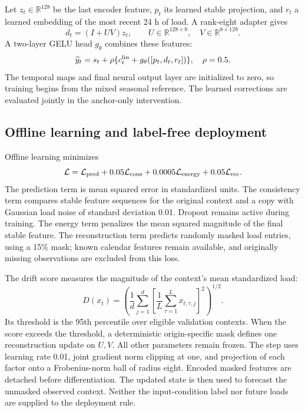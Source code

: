 \documentclass[final,5p,times]{elsarticle}
\newcommand{\R}{\mathbb{R}}
\begin{document}
Let $z_t\in\R^{128}$ be the last encoder feature, $p_t$ its learned stable projection, and $r_t$ a learned embedding of the most recent 24 h of load. A rank-eight adapter gives
\begin{equation}
 d_t=(I+UV)z_t,\qquad U\in\R^{128\times8},\quad V\in\R^{8\times128}.
\end{equation}
A two-layer GELU head $g_\theta$ combines these features:
\begin{equation}
 \widehat y_t=s_t+\rho\{c_t^{\rm lin}+g_\theta([p_t,d_t,r_t])\},\quad \rho=0.5.
 \label{eq:forecast}
\end{equation}
The temporal maps and final neural output layer are initialized to zero, so training begins from the mixed seasonal reference. The learned corrections are evaluated jointly in the anchor-only intervention.

\subsection{Offline learning and label-free deployment}
Offline learning minimizes
\begin{equation}
 \mathcal L=\mathcal L_{\rm pred}
 +0.05\mathcal L_{\rm cons}
 +0.0005\mathcal L_{\rm energy}
 +0.05\mathcal L_{\rm rec}.
\end{equation}
The prediction term is mean squared error in standardized units. The consistency term compares stable feature sequences for the original context and a copy with Gaussian load noise of standard deviation 0.01. Dropout remains active during training. The energy term penalizes the mean squared magnitude of the final stable feature. The reconstruction term predicts randomly masked load entries, using a 15\% mask; known calendar features remain available, and originally missing observations are excluded from this loss.

The drift score measures the magnitude of the context's mean standardized load:
\begin{equation}
 D(x_t)=\left(\frac1d\sum_{j=1}^{d}
 \left[\frac1L\sum_{\tau=1}^{L}x_{t,\tau,j}\right]^2\right)^{1/2}.
\end{equation}
Its threshold is the 95th percentile over eligible validation contexts. When the score exceeds the threshold, a deterministic origin-specific mask defines one reconstruction update on $U,V$. All other parameters remain frozen. The step uses learning rate 0.01, joint gradient norm clipping at one, and projection of each factor onto a Frobenius-norm ball of radius eight. Encoded masked features are detached before differentiation. The updated state is then used to forecast the unmasked observed context. Neither the input-condition label nor future loads are supplied to the deployment rule.
\end{document}
